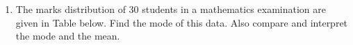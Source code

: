 \renewcommand{\theequation}{\theenumi}
\begin{enumerate}[label=\arabic*.,ref=\thesubsection.\theenumi]
\item The marks distribution of 30 students in a mathematics examination are
given in Table below. Find the mode of this data. Also compare and
interpret the mode and the mean.
\begin{table}[!ht]
	\centering
	
\end{table}
\end{enumerate}
